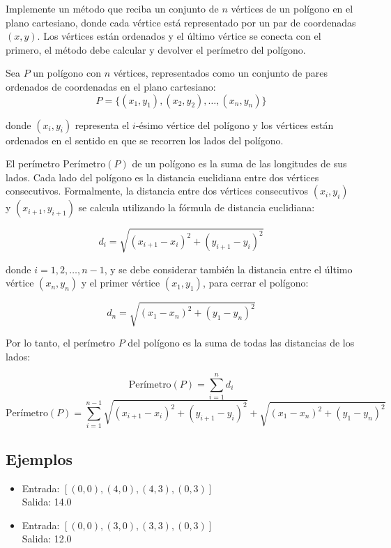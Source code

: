 Implemente un método que reciba un conjunto de \(n\) vértices de un polígono en el plano cartesiano, donde cada vértice está representado por un par de coordenadas \((x, y)\). Los vértices están ordenados y el último vértice se conecta con el primero, el método debe calcular y devolver el perímetro del polígono.
        
Sea \( P \) un polígono con \( n \) vértices, representados como un conjunto de pares ordenados de coordenadas en el plano cartesiano:
\[
P = \{ (x_1, y_1), (x_2, y_2), \dots, (x_n, y_n) \}
\]

donde \( (x_i, y_i) \) representa el \( i \)-ésimo vértice del polígono y los vértices están ordenados en el sentido en que se recorren los lados del polígono. 

El perímetro \( \text{Perímetro}(P) \) de un polígono es la suma de las longitudes de sus lados. Cada lado del polígono es la distancia euclidiana entre dos vértices consecutivos. Formalmente, la distancia entre dos vértices consecutivos \( (x_i, y_i) \) y \( (x_{i+1}, y_{i+1}) \) se calcula utilizando la fórmula de distancia euclidiana:

\[
d_i = \sqrt{(x_{i+1} - x_i)^2 + (y_{i+1} - y_i)^2}
\]

donde \( i = 1, 2, \dots, n-1 \), y se debe considerar también la distancia entre el último vértice \( (x_n, y_n) \) y el primer vértice \( (x_1, y_1) \), para cerrar el polígono:

\[
d_n = \sqrt{(x_1 - x_n)^2 + (y_1 - y_n)^2}
\]

Por lo tanto, el perímetro \( P \) del polígono es la suma de todas las distancias de los lados:

\[
\text{Perímetro}(P) = \sum_{i=1}^{n} d_i 
\]
\[
\text{Perímetro}(P) = \sum_{i=1}^{n-1} \sqrt{(x_{i+1} - x_i)^2 + (y_{i+1} - y_i)^2} + \sqrt{(x_1 - x_n)^2 + (y_1 - y_n)^2}
\]

\subsection*{Ejemplos}

\begin{itemize}
    \item Entrada: \([ (0, 0), (4, 0), (4, 3), (0, 3) ]\) \\
    Salida: 14.0
    \item Entrada: \([ (0, 0), (3, 0), (3, 3), (0, 3) ]\) \\
    Salida: 12.0
\end{itemize}